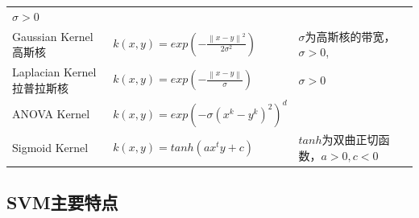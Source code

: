 \begin{longtable}[]{ lll }
\begin{minipage}[t]{0.26\columnwidth}
$\sigma>0$\strut
\end{minipage}\tabularnewline
\begin{minipage}[t]{0.21\columnwidth}\raggedright\strut
Gaussian Kernel高斯核\strut
\end{minipage} & \begin{minipage}[t]{0.44\columnwidth}\raggedright\strut
$k(x,y)=exp(-\frac{\left \|x-y \right \|^{2}}{2\sigma ^{2}})$\strut
\end{minipage} & \begin{minipage}[t]{0.26\columnwidth}\raggedright\strut
$\sigma$为高斯核的带宽，$\sigma>0$,\strut
\end{minipage}\tabularnewline
\begin{minipage}[t]{0.21\columnwidth}\raggedright\strut
Laplacian Kernel拉普拉斯核\strut
\end{minipage} & \begin{minipage}[t]{0.44\columnwidth}\raggedright\strut
$k(x,y)=exp(-\frac{\left \|x-y \right \|}{\sigma})$\strut
\end{minipage} & \begin{minipage}[t]{0.26\columnwidth}\raggedright\strut
$\sigma>0$\strut
\end{minipage}\tabularnewline
\begin{minipage}[t]{0.21\columnwidth}\raggedright\strut
ANOVA Kernel\strut
\end{minipage} & \begin{minipage}[t]{0.44\columnwidth}\raggedright\strut
$k(x,y)=exp(-\sigma(x^{k}-y^{k})^{2})^{d}$\strut
\end{minipage} & \begin{minipage}[t]{0.26\columnwidth}\raggedright\strut
\strut
\end{minipage}\tabularnewline
\begin{minipage}[t]{0.21\columnwidth}\raggedright\strut
Sigmoid Kernel\strut
\end{minipage} & \begin{minipage}[t]{0.44\columnwidth}\raggedright\strut
$k(x,y)=tanh(ax^{t}y+c)$\strut
\end{minipage} & \begin{minipage}[t]{0.26\columnwidth}\raggedright\strut
$tanh$为双曲正切函数，$a>0,c<0$\strut
\end{minipage}\tabularnewline
\end{longtable}

\subsection{ SVM主要特点}\label{svmux4e3bux8981ux7279ux70b9}

